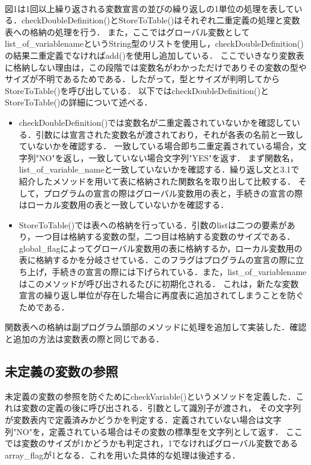 \documentclass[dvipdfmx]{jarticle}
\begin{document}
  \\図1は1回以上繰り返される変数宣言の並びの繰り返しの1単位の処理を表している．checkDoubleDefinition()とStoreToTable()はそれぞれ二重定義の処理と変数表への格納の処理を行う．
また，ここではグローバル変数としてlist\_of\_variablenameというString型のリストを使用し，checkDoubleDefinition()の結果二重定義でなければadd()を使用し追加している．
ここでいきなり変数表に格納しない理由は，この段階では変数名がわかっただけでありその変数の型やサイズが不明であるためである．したがって，型とサイズが判明してからStoreToTable()を呼び出している．
以下ではcheckDoubleDefinition()とStoreToTable()の詳細について述べる．
\begin{itemize}
  \item checkDoubleDefinition()では変数名が二重定義されていないかを確認している．引数には宣言された変数名が渡されており，それが各表の名前と一致していないかを確認する．
  一致している場合即ち二重定義されている場合，文字列"NO"を返し，一致していない場合文字列"YES"を返す．
  まず関数名，list\_of\_variable\_nameと一致していないかを確認する．繰り返し文と3.1で紹介したメソッドを用いて表に格納された関数名を取り出して比較する．
  そして，プログラムの宣言の際はグローバル変数用の表と，手続きの宣言の際はローカル変数用の表と一致していないかを確認する．
  \item StoreToTable()では表への格納を行っている．引数のlistは二つの要素があり，一つ目は格納する変数の型，二つ目は格納する変数のサイズである．
  global\_flagによってグローバル変数用の表に格納するか，ローカル変数用の表に格納するかを分岐させている．このフラグはプログラムの宣言の際に立ち上げ，手続きの宣言の際には下げられている．また，list\_of\_variablenameはこのメソッドが呼び出されるたびに初期化される．
  これは，新たな変数宣言の繰り返し単位が存在した場合に再度表に追加されてしまうことを防ぐためである．
\end{itemize}
関数表への格納は副プログラム頭部のメソッドに処理を追加して実装した．確認と追加の方法は変数表の際と同じである．
\subsection{未定義の変数の参照}
未定義の変数の参照を防ぐためにcheckVariable()というメソッドを定義した．これは変数の定義の後に呼び出される．引数として識別子が渡され，
その文字列が変数表内で定義済みかどうかを判定する．定義されていない場合は文字列"NO"を，定義されている場合はその変数の標準型を文字列として返す．
ここでは変数のサイズが1かどうかも判定され，1でなければグローバル変数であるarray\_flagが1となる．これを用いた具体的な処理は後述する．
\end{document}

